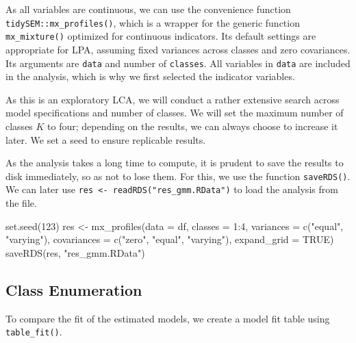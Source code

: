 \documentclass[
  man,floatsintext]{apa6}
\newenvironment{Shaded}{\begin{snugshade}}{\end{snugshade}}
\newcommand{\AttributeTok}[1]{\textcolor[rgb]{0.77,0.63,0.00}{#1}}
\newcommand{\ConstantTok}[1]{\textcolor[rgb]{0.00,0.00,0.00}{#1}}
\newcommand{\DecValTok}[1]{\textcolor[rgb]{0.00,0.00,0.81}{#1}}
\newcommand{\FunctionTok}[1]{\textcolor[rgb]{0.00,0.00,0.00}{#1}}
\newcommand{\NormalTok}[1]{#1}
\newcommand{\OtherTok}[1]{\textcolor[rgb]{0.56,0.35,0.01}{#1}}
\newcommand{\SpecialCharTok}[1]{\textcolor[rgb]{0.00,0.00,0.00}{#1}}
\newcommand{\StringTok}[1]{\textcolor[rgb]{0.31,0.60,0.02}{#1}}
\begin{document}
As all variables are continuous, we can use the convenience function \texttt{tidySEM::mx\_profiles()}, which is a wrapper for the generic function \texttt{mx\_mixture()} optimized for continuous indicators.
Its default settings are appropriate for LPA, assuming fixed variances across classes and zero covariances.
Its arguments are \texttt{data} and number of \texttt{classes}.
All variables in \texttt{data} are included in the analysis, which is why we first selected the indicator variables.

As this is an exploratory LCA, we will conduct a rather extensive search across model specifications and number of classes.
We will set the maximum number of classes \(K\) to four; depending on the results, we can always choose to increase it later.
We set a seed to ensure replicable results.

As the analysis takes a long time to compute, it is prudent to save the results to disk immediately, so as not to lose them.
For this, we use the function \texttt{saveRDS()}.
We can later use \texttt{res\ \textless{}-\ readRDS("res\_gmm.RData")} to load the analysis from the file.

\begin{Shaded}
\begin{Highlighting}[]
\FunctionTok{set.seed}\NormalTok{(}\DecValTok{123}\NormalTok{)}
\NormalTok{res }\OtherTok{\textless{}{-}} \FunctionTok{mx\_profiles}\NormalTok{(}\AttributeTok{data =}\NormalTok{ df,}
                   \AttributeTok{classes =} \DecValTok{1}\SpecialCharTok{:}\DecValTok{4}\NormalTok{,}
                   \AttributeTok{variances =} \FunctionTok{c}\NormalTok{(}\StringTok{"equal"}\NormalTok{, }\StringTok{"varying"}\NormalTok{),}
                   \AttributeTok{covariances =} \FunctionTok{c}\NormalTok{(}\StringTok{"zero"}\NormalTok{, }\StringTok{"equal"}\NormalTok{,}
                                   \StringTok{"varying"}\NormalTok{),}
                   \AttributeTok{expand\_grid =} \ConstantTok{TRUE}\NormalTok{)}
\FunctionTok{saveRDS}\NormalTok{(res, }\StringTok{"res\_gmm.RData"}\NormalTok{)}
\end{Highlighting}
\end{Shaded}

\hypertarget{class-enumeration}{%
\subsection{Class Enumeration}\label{class-enumeration}}

To compare the fit of the estimated models, we create a model fit table using \texttt{table\_fit()}.
\end{document}
